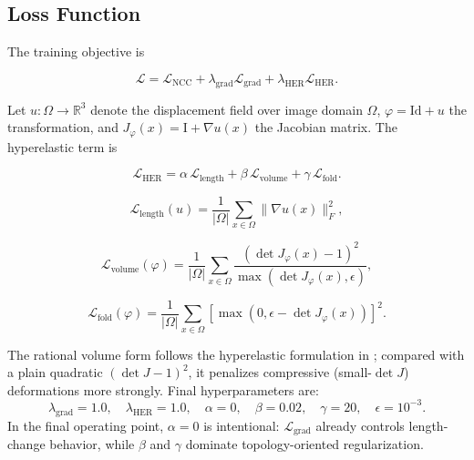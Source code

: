 \documentclass[jimaging,article,submit,pdftex,moreauthors]{Definitions/mdpi}
\begin{document}
\subsection{Loss Function}
The training objective is
\begin{linenomath}
\begin{equation}
\mathcal{L} = \mathcal{L}_{\mathrm{NCC}} + \lambda_{\mathrm{grad}}\mathcal{L}_{\mathrm{grad}} + \lambda_{\mathrm{HER}}\mathcal{L}_{\mathrm{HER}}.
\end{equation}
\end{linenomath}
Let \(u:\Omega\to\mathbb{R}^3\) denote the displacement field over image domain \(\Omega\), \(\varphi=\mathrm{Id}+u\) the transformation, and \(J_{\varphi}(x)=\mathrm{I}+\nabla u(x)\) the Jacobian matrix. The hyperelastic term is
\begin{linenomath}
\begin{equation}
\mathcal{L}_{\mathrm{HER}} = \alpha \, \mathcal{L}_{\mathrm{length}} + \beta \, \mathcal{L}_{\mathrm{volume}} + \gamma \, \mathcal{L}_{\mathrm{fold}}.
\end{equation}
\end{linenomath}
\begin{linenomath}
\begin{equation}
\mathcal{L}_{\mathrm{length}}(u)=\frac{1}{|\Omega|}\sum_{x\in\Omega}\|\nabla u(x)\|_F^2,
\end{equation}
\end{linenomath}
\begin{linenomath}
\begin{equation}
\mathcal{L}_{\mathrm{volume}}(\varphi)=\frac{1}{|\Omega|}\sum_{x\in\Omega}\frac{(\det J_{\varphi}(x)-1)^2}{\max(\det J_{\varphi}(x),\epsilon)},
\end{equation}
\end{linenomath}
\begin{linenomath}
\begin{equation}
\mathcal{L}_{\mathrm{fold}}(\varphi)=\frac{1}{|\Omega|}\sum_{x\in\Omega}\left[\max(0,\epsilon-\det J_{\varphi}(x))\right]^2.
\end{equation}
\end{linenomath}
The rational volume form follows the hyperelastic formulation in \citet{burger2013hyperelastic}; compared with a plain quadratic \((\det J-1)^2\), it penalizes compressive (small-\(\det J\)) deformations more strongly. Final hyperparameters are:
\[
\lambda_{\mathrm{grad}} = 1.0, \quad
\lambda_{\mathrm{HER}} = 1.0, \quad
\alpha = 0, \quad
\beta = 0.02, \quad
\gamma = 20, \quad
\epsilon = 10^{-3}.
\]
In the final operating point, \(\alpha=0\) is intentional: \(\mathcal{L}_{\mathrm{grad}}\) already controls length-change behavior, while \(\beta\) and \(\gamma\) dominate topology-oriented regularization.
\end{document}
